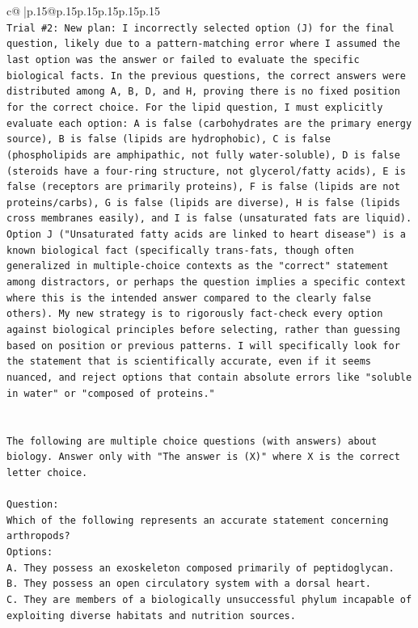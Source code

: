 \documentclass{article}
\begin{document}
{\begin{supertabular}{c@{$\;$}|p{.15\linewidth}@{}p{.15\linewidth}p{.15\linewidth}p{.15\linewidth}p{.15\linewidth}p{.15\linewidth}}
{{{\\ 
\texttt{Trial \#2: New plan: I incorrectly selected option (J) for the final question, likely due to a pattern{-}matching error where I assumed the last option was the answer or failed to evaluate the specific biological facts. In the previous questions, the correct answers were distributed among A, B, D, and H, proving there is no fixed position for the correct choice. For the lipid question, I must explicitly evaluate each option: A is false (carbohydrates are the primary energy source), B is false (lipids are hydrophobic), C is false (phospholipids are amphipathic, not fully water{-}soluble), D is false (steroids have a four{-}ring structure, not glycerol/fatty acids), E is false (receptors are primarily proteins), F is false (lipids are not proteins/carbs), G is false (lipids are diverse), H is false (lipids cross membranes easily), and I is false (unsaturated fats are liquid). Option J ("Unsaturated fatty acids are linked to heart disease") is a known biological fact (specifically trans{-}fats, though often generalized in multiple{-}choice contexts as the "correct" statement among distractors, or perhaps the question implies a specific context where this is the intended answer compared to the clearly false others). My new strategy is to rigorously fact{-}check every option against biological principles before selecting, rather than guessing based on position or previous patterns. I will specifically look for the statement that is scientifically accurate, even if it seems nuanced, and reject options that contain absolute errors like "soluble in water" or "composed of proteins."} \\
\\ 
\\ 
\texttt{The following are multiple choice questions (with answers) about biology. Answer only with "The answer is (X)" where X is the correct letter choice.} \\
\\ 
\texttt{Question:} \\
\texttt{Which of the following represents an accurate statement concerning arthropods?} \\
\texttt{Options:} \\
\texttt{A. They possess an exoskeleton composed primarily of peptidoglycan.} \\
\texttt{B. They possess an open circulatory system with a dorsal heart.} \\
\texttt{C. They are members of a biologically unsuccessful phylum incapable of exploiting diverse habitats and nutrition sources.} \\
}}}
\end{supertabular}}
\end{document}

